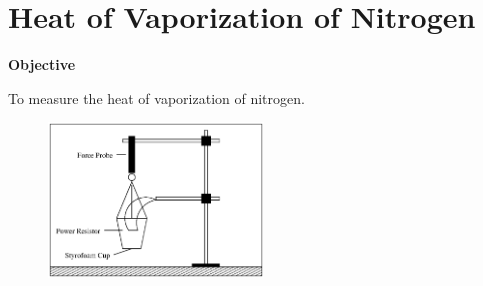 \section{Heat of Vaporization of Nitrogen}

\makelabheader %

\bigskip

\textbf{Objective}

To measure the heat of vaporization of nitrogen.

\begin{figure}
    \includegraphics[width=0.51\textwidth]{latent_heat_of_vaporization_of_nitrogen/heat_vap_nit_fig_1.eps}
\end{figure}

\bigskip

